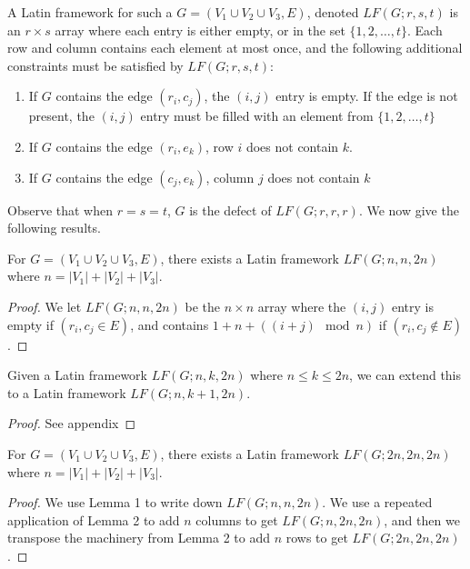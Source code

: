 \documentclass[runningheads,a4paper]{llncs}
\begin{document}
A Latin framework for such a $G = (V_1 \cup V_2 \cup V_3,E)$, denoted $LF(G;r,s,t)$ is an $r \times s$ array where each entry is either empty, or in the set $\{1,2,\dots,t\}$. Each row and column contains each element at most once, and the following additional constraints must be satisfied by $LF(G;r,s,t)$:

\begin{enumerate}
\item If $G$ contains the edge $(r_i,c_j)$, the $(i,j)$ entry is empty. If the edge is not present, the $(i,j)$ entry must be filled with an element from $\{1,2,\dots,t\}$
\item If $G$ contains the edge $(r_i,e_k)$, row $i$ does not contain $k$.
\item If $G$ contains the edge $(c_j,e_k)$, column $j$ does not contain $k$
\end{enumerate}

Observe that when $r = s = t$, $G$ is the defect of $LF(G;r,r,r)$.
We now give the following results.

\begin{lemma} 
For $G = (V_1 \cup V_2 \cup V_3,E)$, there exists a Latin framework $LF(G;n,n,2n)$ where $n = |V_1| + |V_2| + |V_3|$.
\end{lemma}

\begin{proof}
We let $LF(G;n,n,2n)$ be the $n \times n$ array where the $(i,j)$ entry is empty if $(r_i,c_j \in E)$, and contains $1 + n + ((i+j) \mod n)$ if $(r_i,c_j \not\in E)$.
\end{proof}

\begin{lemma} 
Given a Latin framework $LF(G;n,k,2n)$ where $n \leq k \leq 2n$, we can extend this to a Latin framework $LF(G;n,k+1,2n)$.
\end{lemma}

\begin{proof} 
See appendix
\end{proof}

\begin{theorem} 
For $G = (V_1 \cup V_2 \cup V_3,E)$, there exists a Latin framework $LF(G;2n,2n,2n)$ where $n = |V_1| + |V_2| + |V_3|$.
\end{theorem}

\begin{proof}
We use Lemma 1 to write down $LF(G;n,n,2n)$. We use a repeated application of Lemma 2 to add $n$ columns to get $LF(G;n,2n,2n)$, and then we transpose the machinery from Lemma 2 to add $n$ rows to get $LF(G;2n,2n,2n)$.
\end{proof}
\end{document}
